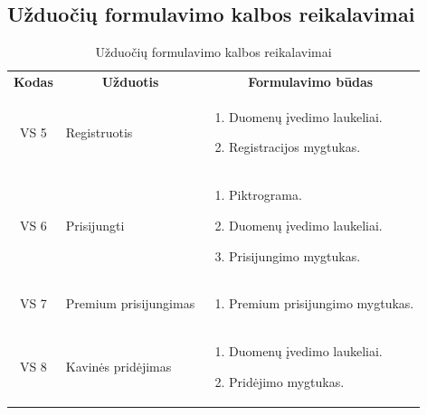 \documentclass{VUMIFPSkursinis}
\begin{document}
\subsection{Užduočių formulavimo kalbos reikalavimai}
\begin{center}

	\begin{longtable}{|p{2cm}|p{}|p{}|}
	\caption{Užduočių formulavimo kalbos reikalavimai}
	\label{table:3}	
	\endfirsthead
	\endhead
	\hline
	    \rowcolor{lightgray}
		\multicolumn{3}{|c|}{Užduočių formulavimo kalbos reikalavimai}\\
		
	\hline
		\multicolumn{1}{|c|}{{\bfseries Kodas}}&
		\multicolumn{1}{|c|}{{\bfseries Užduotis}}&
		\multicolumn{1}{|c|}{{\bfseries Formulavimo būdas}}\\		
	\hline
		\multicolumn{1}{|c|}{VS 5}& 	
		{Registruotis}&
		\multicolumn{1}{|p{8,6cm}|}{
			\begin{enumerate}
				\item Duomenų įvedimo laukeliai.
				\item Registracijos mygtukas.
			\end{enumerate}}\\
	
	\hline
		\multicolumn{1}{|c|}{VS 6}& 	
		{Prisijungti}&
		\multicolumn{1}{|p{8,6cm}|}{
			\begin{enumerate}
				\item Piktrograma. 
				\item Duomenų įvedimo laukeliai.
				\item Prisijungimo  mygtukas.
			\end{enumerate}}\\
	
	\hline
		\multicolumn{1}{|c|}{VS 7}& 	
		{Premium prisijungimas}&
		\multicolumn{1}{|p{8,6cm}|}{
			\begin{enumerate}
				\item Premium prisijungimo mygtukas.
			\end{enumerate}}\\
	
	\hline
		\multicolumn{1}{|c|}{VS 8}& 	
		{Kavinės pridėjimas}&
		\multicolumn{1}{|p{8,6cm}|}{
			\begin{enumerate}
				\item Duomenų įvedimo laukeliai.
				\item Pridėjimo mygtukas.
			\end{enumerate}}\\
	

\end{longtable}
\end{center}
\end{document}
